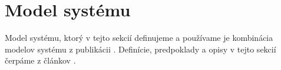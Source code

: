 







\section{Model systému}
\label{sysmodel:solution}
Model systému, ktorý v tejto sekcií definujeme a používame je kombinácia modelov systému z publikácii \cite{Li_2021,offlineoptimal,chen2021smoothed,Li_information_aggregation}. Definície, predpoklady a opisy v tejto sekcií čerpáme z článkov \cite{Li_2021,offlineoptimal,chen2021smoothed,Li_information_aggregation}.



